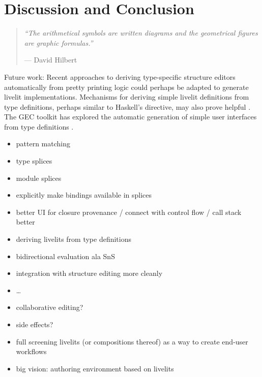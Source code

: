 \section{Discussion and Conclusion}\label{sec:discussion}\label{sec:conclusion}
\begin{quote}
  \textit{
  ``The arithmetical symbols are written diagrams and the geometrical figures are graphic formulas.''
  }
  
  \vspace{3pt}
  
  \hfill{}--- David Hilbert~\cite{XXX}
  \end{quote}

Future work:
Recent approaches to deriving type-specific structure editors automatically from pretty printing logic \cite{hempeltiny} could perhaps 
be adapted to generate livelit implementations. Mechanisms for deriving simple 
livelit definitions from type definitions, perhaps similar to Haskell's  directive, 
may also prove helpful \cite{magalhaes2010generic}. The GEC toolkit has explored  
the automatic generation of simple user interfaces from type definitions \cite{DBLP:conf/afp/AchtenEPW04}.


\begin{itemize}
  \item pattern matching
  \item type splices
  \item module splices
  \item explicitly make bindings available in splices
  \item better UI for closure provenance / connect with control flow / call stack better
  \item deriving livelits from type definitions
  \item bidirectional evaluation ala SnS
  \item integration with structure editing more cleanly
  \item \dots
  \item collaborative editing?
  \item side effects?
  \item full screening livelits (or compositions thereof) as a way to create end-user workflows
  \item big vision: authoring environment based on livelits
\end{itemize}
